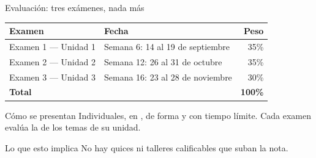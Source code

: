 \documentclass[aspectratio=169,10pt]{beamer}
\begin{document}
\begin{frame}{Evaluación: tres exámenes, nada más}
  \footnotesize
  \begin{center}
  \begin{tabular}{@{}llr@{}}
    \toprule
    \textbf{Examen} & \textbf{Fecha} & \textbf{Peso} \\
    \midrule
    Examen 1 — Unidad 1 & Semana 6: 14 al 19 de septiembre & 35\% \\
    Examen 2 — Unidad 2 & Semana 12: 26 al 31 de octubre   & 35\% \\
    Examen 3 — Unidad 3 & Semana 16: 23 al 28 de noviembre & 30\% \\
    \midrule
    \textbf{Total} & & \textbf{100\%} \\
    \bottomrule
  \end{tabular}
  \end{center}

  \vspace{0.1cm}
  \begin{block}{Cómo se presentan}
    \tiny
    Individuales, en , de forma
     y con tiempo límite. Cada examen evalúa la
     de los temas de su unidad.
  \end{block}

  \vspace{0.08cm}
  \begin{alertblock}{Lo que esto implica}
    \tiny
    No hay quices ni talleres calificables que suban la nota. 
  \end{alertblock}
\end{frame}
\end{document}

